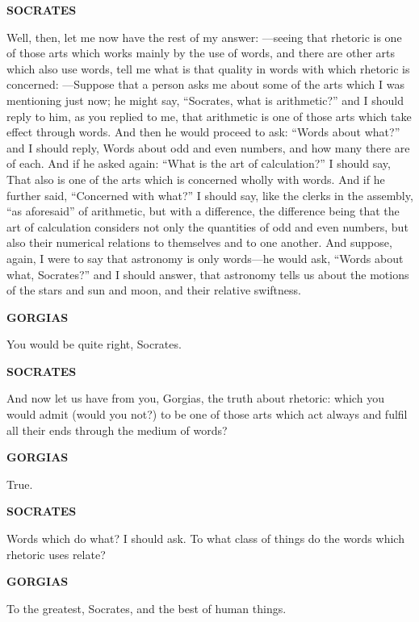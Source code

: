 \documentclass[11pt,letter]{article}
\begin{document}
\par \textbf{SOCRATES}
\par   Well, then, let me now have the rest of my answer: —seeing that rhetoric is one of those arts which works mainly by the use of words, and there are other arts which also use words, tell me what is that quality in words with which rhetoric is concerned: —Suppose that a person asks me about some of the arts which I was mentioning just now; he might say, “Socrates, what is arithmetic?” and I should reply to him, as you replied to me, that arithmetic is one of those arts which take effect through words. And then he would proceed to ask:  “Words about what?” and I should reply, Words about odd and even numbers, and how many there are of each. And if he asked again:  “What is the art of calculation?” I should say, That also is one of the arts which is concerned wholly with words. And if he further said, “Concerned with what?” I should say, like the clerks in the assembly, “as aforesaid” of arithmetic, but with a difference, the difference being that the art of calculation considers not only the quantities of odd and even numbers, but also their numerical relations to themselves and to one another. And suppose, again, I were to say that astronomy is only words—he would ask, “Words about what, Socrates?” and I should answer, that astronomy tells us about the motions of the stars and sun and moon, and their relative swiftness.

\par \textbf{GORGIAS}
\par   You would be quite right, Socrates.

\par \textbf{SOCRATES}
\par   And now let us have from you, Gorgias, the truth about rhetoric:  which you would admit (would you not?) to be one of those arts which act always and fulfil all their ends through the medium of words?

\par \textbf{GORGIAS}
\par   True.

\par \textbf{SOCRATES}
\par   Words which do what? I should ask. To what class of things do the words which rhetoric uses relate?

\par \textbf{GORGIAS}
\par   To the greatest, Socrates, and the best of human things.
\end{document}
